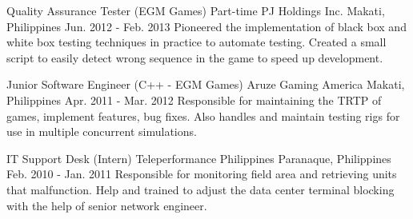 \begin{cventries}
    \cventry
        {Quality Assurance Tester (EGM Games) Part-time}
        {PJ Holdings Inc.}
        {Makati, Philippines}
        {Jun. 2012 - Feb. 2013}
        {Pioneered the implementation of black box and white box testing techniques in practice to automate testing. Created a small script to easily detect wrong sequence in the game to speed up development.}
        
    \cventry
        {Junior Software Engineer (C++ - EGM Games)}
        {Aruze Gaming America}
        {Makati, Philippines}
        {Apr. 2011 - Mar. 2012}
        {Responsible for maintaining the TRTP of games, implement features, bug fixes. Also handles and maintain testing rigs for use in multiple concurrent simulations.}

    \cventry
        {IT Support Desk (Intern)}
        {Teleperformance Philippines}
        {Paranaque, Philippines}
        {Feb. 2010 - Jan. 2011}
        {Responsible for monitoring field area and retrieving units that malfunction. Help and trained to adjust the data center terminal blocking with the help of senior network engineer.}

\end{cventries}

\vspace{1mm}
